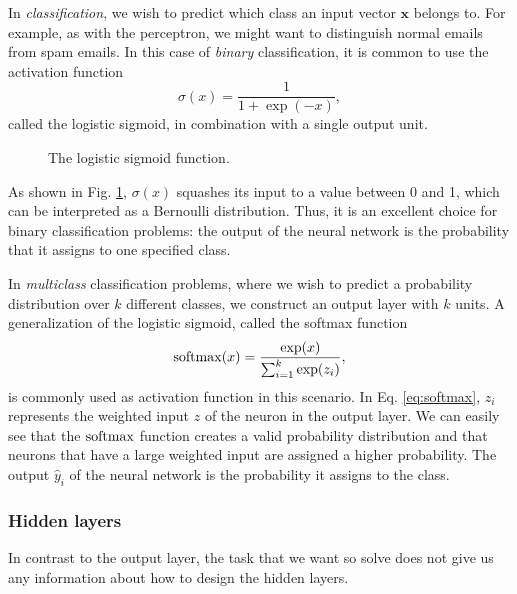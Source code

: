 In \emph{classification}, we wish to predict which class an input vector $\bm{x}$ belongs to. For example, as with the perceptron, we might want to distinguish normal emails from spam emails. In this case of \emph{binary} classification, it is common to use the activation function
\begin{equation}
\sigma(x) = \frac1{1+\exp(-x)},
\end{equation}
called the logistic sigmoid, in combination with a single output unit.
\begin{figure}
	\begin{center}
		
	\end{center}
	\caption{The logistic sigmoid function.}
	\label{fig:sigmoid}
\end{figure}
As shown in Fig. \ref{fig:sigmoid}, $\sigma(x)$ squashes its input to a value between 0 and 1, which can be interpreted as a Bernoulli distribution. Thus, it is an excellent choice for binary classification problems: the output of the neural network is the probability that it assigns to one specified class.

In \emph{multiclass} classification problems, where we wish to predict a probability distribution over $k$ different classes, we construct an output layer with $k$ units. A generalization of the logistic sigmoid, called the softmax function
\begin{equation}\label{eq:softmax}
\operatorname{softmax}(x) = \frac{\exp(x)}{\sum_{i=1}^{k}\exp(z_i)},
\end{equation}
is commonly used as activation function in this scenario. In Eq. \eqref{eq:softmax}, $z_i$ represents the weighted input $z$ of the  neuron in the output layer. We can easily see that the $\operatorname{softmax}$ function creates a valid probability distribution and that neurons that have a large weighted input are assigned a higher probability. The output $\hat{y}_i$ of the neural network is the probability it assigns to the  class.

\subsubsection{Hidden layers}
In contrast to the output layer, the task that we want so solve does not give us any information about how to design the hidden layers. 